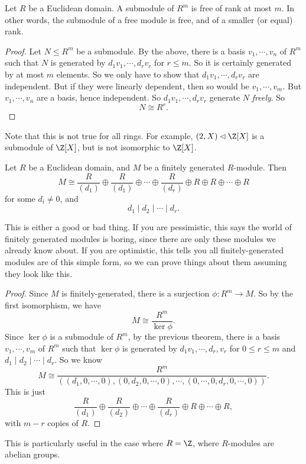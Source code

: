 \documentclass[a4paper]{article}
\begin{document}
\begin{cor}
  Let $R$ be a Euclidean domain. A submodule of $R^m$ is free of rank at most $m$. In other words, the submodule of a free module is free, and of a smaller (or equal) rank.
\end{cor}

\begin{proof}
  Let $N \leq R^m$ be a submodule. By the above, there is a basis $v_1, \cdots, v_n$ of $R^m$ such that $N$ is generated by $d_1 v_1, \cdots, d_r v_r$ for $r \leq m$. So it is certainly generated by at most $m$ elements. So we only have to show that $d_1 v_1, \cdots, d_r v_r$ are independent. But if they were linearly dependent, then so would be $v_1, \cdots, v_m$. But $v_1, \cdots, v_n$ are a basis, hence independent. So $d_1 v_1, \cdots, d_r v_r$ generate $N$ \emph{freely}. So
  \[
    N \cong R^r.
  \]
\end{proof}
Note that this is not true for all rings. For example, $(2, X) \lhd \Z[X]$ is a submodule of $\Z[X]$, but is not isomorphic to $\Z[X]$.

\begin{thm}
  Let $R$ be a Euclidean domain, and $M$ be a finitely generated $R$-module. Then
  \[
    M \cong \frac{R}{(d_1)} \oplus \frac{R}{(d_1)} \oplus \cdots \oplus\frac{R}{(d_r)} \oplus R \oplus R \oplus \cdots \oplus R
  \]
  for some $d_i \not= 0$, and
  \[
    d_1 \mid d_2 \mid \cdots \mid d_r.
  \]
\end{thm}
This is either a good or bad thing. If you are pessimistic, this says the world of finitely generated modules is boring, since there are only these modules we already know about. If you are optimistic, this tells you all finitely-generated modules are of this simple form, so we can prove things about them assuming they look like this.

\begin{proof}
  Since $M$ is finitely-generated, there is a surjection $\phi: R^m \to M$. So by the first isomorphism, we have
  \[
    M \cong \frac{R^m}{\ker \phi}.
  \]
  Since $\ker \phi$ is a submodule of $R^m$, by the previous theorem, there is a basis $v_1, \cdots, v_m$ of $R^m$ such that $\ker \phi$ is generated by $d_1 v_1, \cdots, d_r, v_r$ for $0 \leq r \leq m$ and $d_1 \mid d_2 \mid \cdots \mid d_r$. So we know
  \[
    M \cong \frac{R^m}{((d_1, 0, \cdots, 0), (0, d_2, 0, \cdots, 0), \cdots, (0, \cdots, 0, d_r, 0, \cdots, 0))}.
  \]
  This is just
  \[
    \frac{R}{(d_1)} \oplus \frac{R}{(d_2)} \oplus \cdots \oplus \frac{R}{(d_r)} \oplus R \oplus \cdots \oplus R,
  \]
  with $m - r$ copies of $R$.
\end{proof}
This is particularly useful in the case where $R = \Z$, where $R$-modules are abelian groups.
\end{document}
